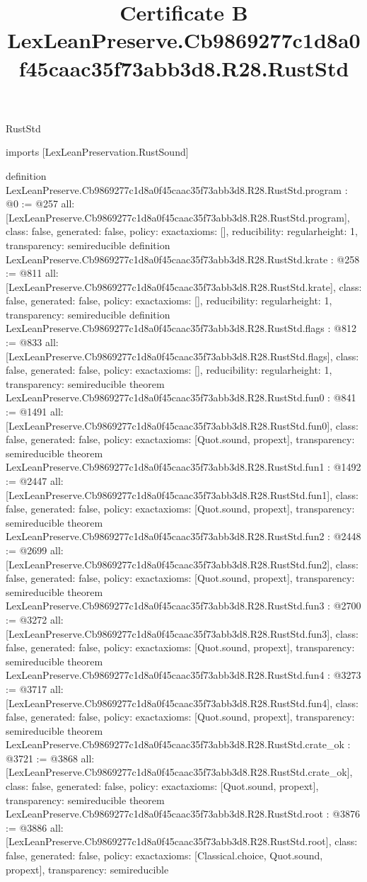 \begin{lexlean}{RustStd}
\title{Certificate B LexLeanPreserve.Cb9869277c1d8a0f45caac35f73abb3d8.R28.RustStd}
\begin{coremodule}
imports [LexLeanPreservation.RustSound]

definition LexLeanPreserve.Cb9869277c1d8a0f45caac35f73abb3d8.R28.RustStd.program : @0 := @257 {
  all: [LexLeanPreserve.Cb9869277c1d8a0f45caac35f73abb3d8.R28.RustStd.program],
  class: false,
  generated: false,
  policy: exact{axioms: []},
  reducibility: regular{height: 1},
  transparency: semireducible
}
definition LexLeanPreserve.Cb9869277c1d8a0f45caac35f73abb3d8.R28.RustStd.krate : @258 := @811 {
  all: [LexLeanPreserve.Cb9869277c1d8a0f45caac35f73abb3d8.R28.RustStd.krate],
  class: false,
  generated: false,
  policy: exact{axioms: []},
  reducibility: regular{height: 1},
  transparency: semireducible
}
definition LexLeanPreserve.Cb9869277c1d8a0f45caac35f73abb3d8.R28.RustStd.flags : @812 := @833 {
  all: [LexLeanPreserve.Cb9869277c1d8a0f45caac35f73abb3d8.R28.RustStd.flags],
  class: false,
  generated: false,
  policy: exact{axioms: []},
  reducibility: regular{height: 1},
  transparency: semireducible
}
theorem LexLeanPreserve.Cb9869277c1d8a0f45caac35f73abb3d8.R28.RustStd.fun0 : @841 := @1491 {
  all: [LexLeanPreserve.Cb9869277c1d8a0f45caac35f73abb3d8.R28.RustStd.fun0],
  class: false,
  generated: false,
  policy: exact{axioms: [Quot.sound, propext]},
  transparency: semireducible
}
theorem LexLeanPreserve.Cb9869277c1d8a0f45caac35f73abb3d8.R28.RustStd.fun1 : @1492 := @2447 {
  all: [LexLeanPreserve.Cb9869277c1d8a0f45caac35f73abb3d8.R28.RustStd.fun1],
  class: false,
  generated: false,
  policy: exact{axioms: [Quot.sound, propext]},
  transparency: semireducible
}
theorem LexLeanPreserve.Cb9869277c1d8a0f45caac35f73abb3d8.R28.RustStd.fun2 : @2448 := @2699 {
  all: [LexLeanPreserve.Cb9869277c1d8a0f45caac35f73abb3d8.R28.RustStd.fun2],
  class: false,
  generated: false,
  policy: exact{axioms: [Quot.sound, propext]},
  transparency: semireducible
}
theorem LexLeanPreserve.Cb9869277c1d8a0f45caac35f73abb3d8.R28.RustStd.fun3 : @2700 := @3272 {
  all: [LexLeanPreserve.Cb9869277c1d8a0f45caac35f73abb3d8.R28.RustStd.fun3],
  class: false,
  generated: false,
  policy: exact{axioms: [Quot.sound, propext]},
  transparency: semireducible
}
theorem LexLeanPreserve.Cb9869277c1d8a0f45caac35f73abb3d8.R28.RustStd.fun4 : @3273 := @3717 {
  all: [LexLeanPreserve.Cb9869277c1d8a0f45caac35f73abb3d8.R28.RustStd.fun4],
  class: false,
  generated: false,
  policy: exact{axioms: [Quot.sound, propext]},
  transparency: semireducible
}
theorem LexLeanPreserve.Cb9869277c1d8a0f45caac35f73abb3d8.R28.RustStd.crate_ok : @3721 := @3868 {
  all: [LexLeanPreserve.Cb9869277c1d8a0f45caac35f73abb3d8.R28.RustStd.crate_ok],
  class: false,
  generated: false,
  policy: exact{axioms: [Quot.sound, propext]},
  transparency: semireducible
}
theorem LexLeanPreserve.Cb9869277c1d8a0f45caac35f73abb3d8.R28.RustStd.root : @3876 := @3886 {
  all: [LexLeanPreserve.Cb9869277c1d8a0f45caac35f73abb3d8.R28.RustStd.root],
  class: false,
  generated: false,
  policy: exact{axioms: [Classical.choice, Quot.sound, propext]},
  transparency: semireducible
}


\end{coremodule}
\end{lexlean}
